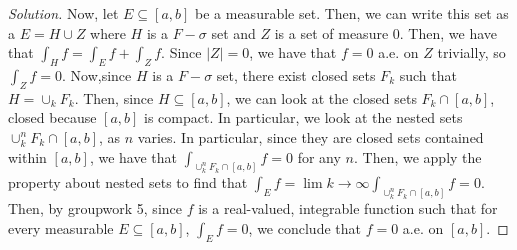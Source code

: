 \documentclass[10pt]{article}
\begin{document}
\begin{proof}[Solution]
Now, let $E \subseteq [a,b]$ be a measurable set. Then, we can write this set as a $E = H \cup Z$ where $H$ is a $F-\sigma$ set and $Z$ is a set of measure 0. Then, we have that $\int_H f = \int_E f + \int_Z f$. Since $|Z| = 0$, we have that $f = 0$ a.e. on $Z$ trivially, so $\int_Z f = 0$. Now,since $H$ is a $F-\sigma$ set, there exist closed sets $F_k$ such that $H = \cup_k F_k$. Then, since $H \subseteq [a,b]$, we can look at the closed sets $F_k \cap [a,b]$, closed because $[a,b]$ is compact. In particular, we look at the nested sets $\cup_k^n F_k \cap [a,b]$, as $n$ varies. In particular, since they are closed sets contained within $[a,b]$, we have that $\int_{\cup_k^n F_k \cap [a,b]} f = 0$ for any $n$. Then, we apply the property about nested sets to find that $\int_{E} f = \lim{k \to\infty}\int_{\cup_k^n F_k \cap [a,b]} f = 0$. Then, by groupwork 5, since $f$ is a real-valued, integrable function such that for every measurable $E \subseteq [a,b]$, $\int_E f = 0$, we conclude that $f = 0$ a.e. on $[a,b]$. 

\end{proof}
\end{document}

